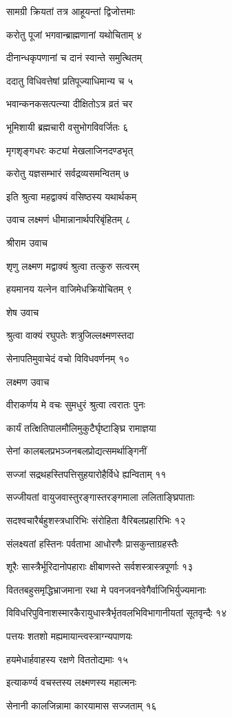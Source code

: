 सामग्री क्रियतां तत्र आहूयन्तां द्विजोत्तमाः

करोतु पूजां भगवान्ब्राह्मणानां यथोचिताम् ४

दीनान्धकृपणानां च दानं स्वान्ते समुत्थितम्

ददातु विधिवत्तेषां प्रतिपूज्याधिमान्य च ५

भवान्कनकसत्पत्न्या दीक्षितोऽत्र व्रतं चर

भूमिशायी ब्रह्मचारी वसुभोगविवर्जितः ६

मृगशृङ्गधरः कट्यां मेखलाजिनदण्डभृत्

करोतु यज्ञसम्भारं सर्वद्रव्यसमन्वितम् ७

इति श्रुत्वा महद्वाक्यं वसिष्ठस्य यथार्थकम्

उवाच लक्ष्मणं धीमान्नानार्थपरिबृंहितम् ८

श्रीराम उवाच

शृणु लक्ष्मण मद्वाक्यं श्रुत्वा तत्कुरु सत्वरम्

हयमानय यत्नेन वाजिमेधक्रियोचितम् ९

शेष उवाच

श्रुत्वा वाक्यं रघुपतेः शत्रुजिल्लक्ष्मणस्तदा

सेनापतिमुवाचेदं वचो विविधवर्णनम् १०

लक्ष्मण उवाच

वीराकर्णय मे वचः सुमधुरं श्रुत्वा त्वरातः पुनः

कार्यं तत्क्षितिपालमौलिमुकुटैर्घृष्टाङ्घ्रि रामाज्ञया

सेनां कालबलप्रभञ्जनबलप्रोद्यत्समर्थाङ्गिनीं

सज्जां सद्रथहस्तिपत्तिसुहयारोहैर्विधे ह्यन्विताम् ११

सज्जीयतां वायुजवास्तुरङ्गास्तरङ्गमाला ललिताङ्घ्रिपाताः

सदश्वचारैर्बहुशस्त्रधारिभिः संरोहिता वैरिबलप्रहारिभिः १२

संलक्ष्यतां हस्तिनः पर्वताभा आधोरणैः प्रासकुन्ताग्रहस्तैः

शूरैः सास्त्रैर्भूरिदानोपहाराः क्षीबाणस्ते सर्वशस्त्रास्त्रपूर्णाः १३

विततबहुसमृद्धिभ्राजमाना रथा मे पवनजवनवेगैर्वाजिभिर्युज्यमानाः

विविधरिपुविनाशस्मारकैरायुधास्त्रैर्भृतवलभिविभागानीयतां सूतवृन्दैः १४

पत्तयः शतशो मह्यमायान्त्वस्त्राग्न्यपाणयः

हयमेधार्हवाहस्य रक्षणे विततोद्यमाः १५

इत्याकर्ण्य वचस्तस्य लक्ष्मणस्य महात्मनः

सेनानी कालजिन्नामा कारयामास सज्जताम् १६

